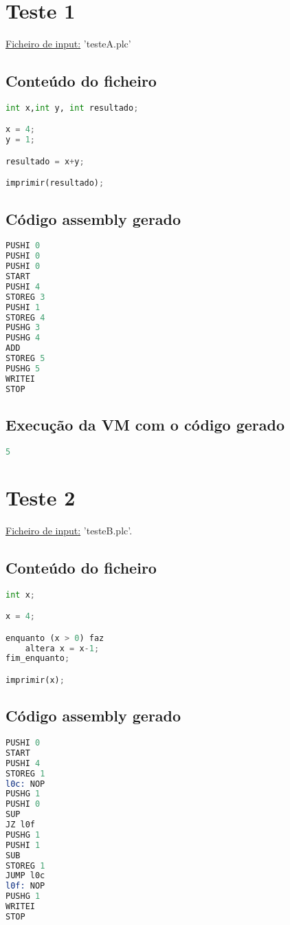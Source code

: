 \documentclass[11pt,a4paper]{report}
\begin{document}
\section{Teste 1}
\underline{Ficheiro de input:} 'testeA.plc'
\subsection{Conteúdo do ficheiro}

\begin{lstlisting}[language=python]
int x,int y, int resultado;

x = 4;
y = 1;

resultado = x+y;

imprimir(resultado);
\end{lstlisting}

\subsection{Código assembly gerado}
\begin{lstlisting}[language=Assembler]
PUSHI 0
PUSHI 0
PUSHI 0
START
PUSHI 4
STOREG 3
PUSHI 1
STOREG 4
PUSHG 3
PUSHG 4
ADD
STOREG 5
PUSHG 5
WRITEI
STOP
\end{lstlisting}

\subsection{Execução da VM com o código gerado}
\begin{lstlisting}[language=python]
5
\end{lstlisting}

\section{Teste 2}
\underline{Ficheiro de input:} 'testeB.plc'.

\subsection{Conteúdo do ficheiro}

\begin{lstlisting}[language=python]
int x;

x = 4;

enquanto (x > 0) faz
    altera x = x-1;
fim_enquanto;

imprimir(x);
\end{lstlisting}

\subsection{Código assembly gerado}
\begin{lstlisting}[language=Assembler]
PUSHI 0
START
PUSHI 4
STOREG 1
l0c: NOP
PUSHG 1
PUSHI 0
SUP
JZ l0f
PUSHG 1
PUSHI 1
SUB
STOREG 1
JUMP l0c
l0f: NOP
PUSHG 1
WRITEI
STOP
\end{lstlisting}
\end{document}
